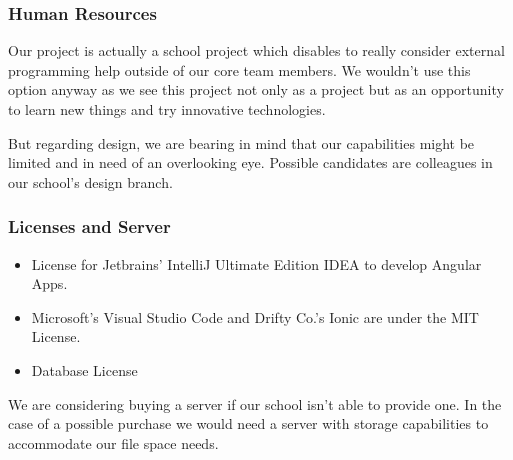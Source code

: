 \documentclass[12pt]{article}
\theoremstyle{definition}
\newenvironment{text}{
}{}
\begin{document}
\subsubsection{Human Resources}
\begin{text}
Our project is actually a school project which disables to really consider external programming help outside of our core team members. We wouldn't use this option anyway as we see this project not only as a project but as an opportunity to learn new things and try innovative technologies.

But regarding design, we are bearing in mind that our capabilities might be limited and in need of an overlooking eye. Possible candidates are colleagues in our school's design branch.\end{text}

\subsubsection{Licenses and Server}
\begin{itemize}
\item License for Jetbrains' IntelliJ Ultimate Edition IDEA to develop Angular Apps.
\item Microsoft's Visual Studio Code and Drifty Co.'s Ionic are under the MIT License.
\item Database License
\end{itemize}

We are considering buying a server if our school isn't able to provide one. In the case of a possible purchase we would need a server with storage capabilities to accommodate our file space needs.
\end{document}
